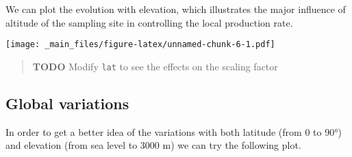 \documentclass[
]{book}
\newenvironment{Shaded}{\begin{snugshade}}{\end{snugshade}}
\newcommand{\AttributeTok}[1]{\textcolor[rgb]{0.77,0.63,0.00}{#1}}
\newcommand{\FunctionTok}[1]{\textcolor[rgb]{0.00,0.00,0.00}{#1}}
\newcommand{\NormalTok}[1]{#1}
\newcommand{\SpecialCharTok}[1]{\textcolor[rgb]{0.00,0.00,0.00}{#1}}
\newcommand{\StringTok}[1]{\textcolor[rgb]{0.31,0.60,0.02}{#1}}
\begin{document}
We can plot the evolution with elevation, which illustrates the major influence of altitude of the sampling site in controlling the local production rate.

\begin{Shaded}
\end{Shaded}

\texttt{[image: \_main\_files/figure-latex/unnamed-chunk-6-1.pdf]}

\begin{quote}
\textbf{TODO} Modify \texttt{lat} to see the effects on the scaling factor
\end{quote}

\hypertarget{global-variations}{%
\subsection{Global variations}\label{global-variations}}

In order to get a better idea of the variations with both latitude (from 0 to 90°) and elevation (from sea level to 3000 m) we can try the following plot.
\end{document}
